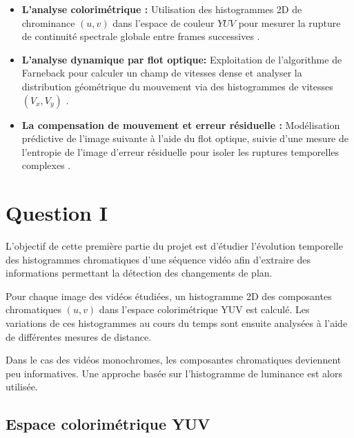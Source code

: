 \documentclass[11pt,a4paper]{article}
\begin{document}
            \begin{itemize}
            
                \item \textbf{L'analyse colorimétrique :} Utilisation des histogrammes 2D de chrominance $(u, v)$ dans l'espace de couleur $YUV$ pour mesurer la rupture de continuité spectrale globale entre frames successives .
                \item \textbf{L'analyse dynamique par flot optique:} Exploitation de l'algorithme de Farneback pour calculer un champ de vitesses dense et analyser la distribution géométrique du mouvement via des histogrammes de vitesses $(V_x, V_y)$ .
                \item \textbf{La compensation de mouvement et erreur résiduelle :} Modélisation prédictive de l'image suivante à l'aide du flot optique, suivie d'une mesure de l'entropie de l'image d'erreur résiduelle pour isoler les ruptures temporelles complexes .
            
            \end{itemize}
            
    \section*{Question I}
    
    
    L’objectif de cette première partie du projet est d’étudier l’évolution temporelle des histogrammes chromatiques d’une séquence vidéo afin d’extraire des informations permettant la détection des changements de plan.
    
    Pour chaque image des vidéos étudiées, un histogramme 2D des composantes chromatiques $(u,v)$ dans l’espace colorimétrique YUV est calculé. Les variations de ces histogrammes au cours du temps sont ensuite analysées à l’aide de différentes mesures de distance.
    
    Dans le cas des vidéos monochromes, les composantes chromatiques deviennent peu informatives. Une approche basée sur l’histogramme de luminance est alors utilisée.
    
    
    \subsection*{Espace colorimétrique YUV}
    
\end{document}
